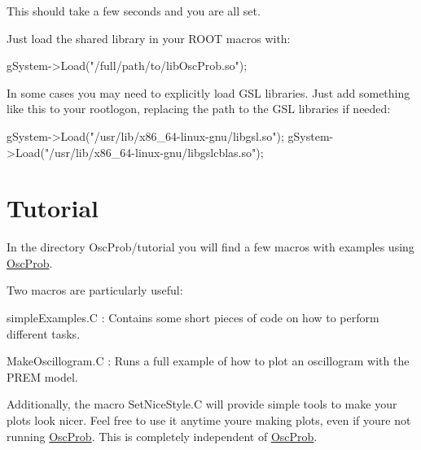 This should take a few seconds and you are all set.

Just load the shared library in your R\+O\+OT macros with\+: 
\begin{DoxyCode}
gSystem->Load(\textcolor{stringliteral}{"/full/path/to/libOscProb.so"});
\end{DoxyCode}


In some cases you may need to explicitly load G\+SL libraries. Just add something like this to your rootlogon, replacing the path to the G\+SL libraries if needed\+: 
\begin{DoxyCode}
gSystem->Load(\textcolor{stringliteral}{"/usr/lib/x86\_64-linux-gnu/libgsl.so"});
gSystem->Load(\textcolor{stringliteral}{"/usr/lib/x86\_64-linux-gnu/libgslcblas.so"});
\end{DoxyCode}


\section*{Tutorial}

In the directory Osc\+Prob/tutorial you will find a few macros with examples using \hyperlink{namespaceOscProb}{Osc\+Prob}.

Two macros are particularly useful\+:
\begin{DoxyItemize}
\item {\ttfamily simple\+Examples.\+C} \+: Contains some short pieces of code on how to perform different tasks.
\item {\ttfamily Make\+Oscillogram.\+C} \+: Runs a full example of how to plot an oscillogram with the P\+R\+EM model.
\end{DoxyItemize}

Additionally, the macro {\ttfamily Set\+Nice\+Style.\+C} will provide simple tools to make your plots look nicer. Feel free to use it anytime you\textquotesingle{}re making plots, even if you\textquotesingle{}re not running \hyperlink{namespaceOscProb}{Osc\+Prob}. This is completely independent of \hyperlink{namespaceOscProb}{Osc\+Prob}. 